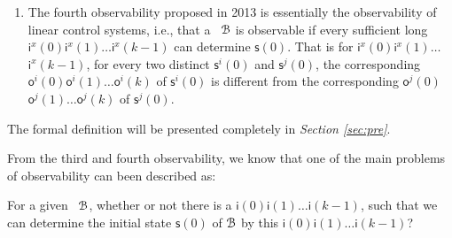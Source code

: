 \begin{enumerate}
	\item  The fourth observability proposed in 2013 \cite{Fornasini2013Observability} is essentially the observability of linear control systems, i.e., that a \BCN\ ${\mathcal{B}}$ is observable if every sufficient long $\mathsf{i}^{x}(0)$$\mathsf{i}^{x}(1)\ldots$$\mathsf{i}^{x}(k-1)$ can determine $\mathsf{s}(0)$. That is for $\mathsf{i}^{x}(0)$$\mathsf{i}^{x}(1)\ldots$ $\mathsf{i}^{x}(k-1)$, for every two distinct $\mathsf{s}^{i}(0)$ and $\mathsf{s}^{j}(0)$, the corresponding $\mathsf{o}^{i}(0)$$\mathsf{o}^{i}(1)\ldots$$\mathsf{o}^{i}(k)$ of $\mathsf{s}^{i}(0)$ is different from the corresponding $\mathsf{o}^{j}(0)$$\mathsf{o}^{j}(1)\ldots$$\mathsf{o}^{j}(k)$ of $\mathsf{s}^{j}(0)$.%
\end{enumerate}
 The formal definition will be presented completely in {\em Section \ref{sec:pre}}.
 
 From the third and fourth observability, we know that one of the main problems of observability can been described as: 
\begin{problem}
\label{pro:1}
For a given \BCN\ ${\mathcal{B}}$, whether or not there is a $\mathsf{i}(0)\mathsf{i}(1)\ldots\mathsf{i}(k-1)$, such that we can determine the initial state $\mathsf{s}(0)$ of ${\mathcal{B}}$ by this $\mathsf{i}(0)\mathsf{i}(1)\ldots\mathsf{i}(k-1)$?
\end{problem}

